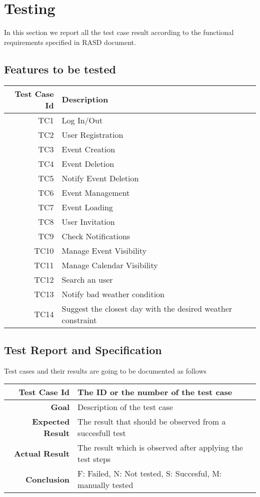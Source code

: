 \chapter{Testing} \label{cap:cap2}
In this section we report all the test case result according to the functional requirements specified in RASD document.

 \section{Features to be tested}
 \begin{tabularx}{\linewidth}{|r|X|X|}
  \hline  {\bf Test Case Id} &{\bf Description}\\
  \hline TC1 & Log In/Out \\
  \hline TC2 & User Registration \\
  \hline TC3 & Event Creation \\
  \hline TC4 & Event Deletion \\
  \hline TC5 & Notify Event Deletion \\
  \hline TC6 & Event Management \\
  \hline TC7 & Event Loading\\
  \hline TC8 & User Invitation \\
  \hline TC9 & Check Notifications \\
  \hline TC10 & Manage Event Visibility \\
  \hline TC11 & Manage Calendar Visibility \\
  \hline TC12 & Search an user \\
  \hline TC13 & Notify bad weather condition \\ 
  \hline TC14 & Suggest the closest day with the desired weather constraint \\
  \hline
\end{tabularx}
 
\section{Test Report and Specification}
Test cases and their results are going to be documented as follows\\
\begin{tabularx}{\linewidth}{|r|X|X|}
  \hline   {\bf Test Case Id} &  The ID or the number of the test case\\
  \hline  {\bf Goal} & Description of the test case\\
  \hline  {\bf Expected Result} & The result that should be observed from a succesfull test\\
  \hline  {\bf Actual Result} & The result which is observed after applying the test steps\\
  \hline  {\bf Conclusion} & F: Failed, N: Not tested, S: Succesful, M: manually tested\\
  \hline
\end{tabularx}

